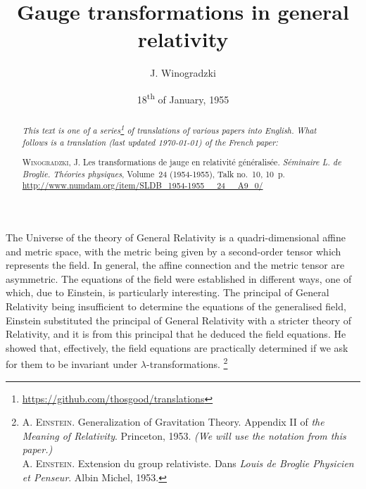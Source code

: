 \documentclass{article}
\theoremstyle{plain}
\theoremstyle{definition}
\newcommand{\oldpage}[1]{\marginpar{\footnotesize$\Big\vert$ \textit{p.~#1}}}
\begin{document}
\renewcommand{\abstractname}{Translator's note.}

\title{Gauge transformations in general relativity}
\author{J. Winogradzki}
\date{18\textsuperscript{th} of January, 1955}
\maketitle

\begin{abstract}
  \renewcommand*{\thefootnote}{\fnsymbol{footnote}}
  \emph{This text is one of a series\footnote{\url{https://github.com/thosgood/translations}} of translations of various papers into English.}
  \emph{What follows is a translation (last updated \today) of the French paper:}

  \medskip\noindent
  \textsc{Winogradzki, J}. Les transformations de jauge en relativité généralisée. \emph{Séminaire L. de Broglie. Théories physiques}, Volume~24 (1954-1955), Talk no.~10, 10~p. {\footnotesize\url{http://www.numdam.org/item/SLDB_1954-1955__24__A9_0/}}
\end{abstract}

\renewcommand*{\thefootnote}{(\arabic{footnote})}
\setcounter{footnote}{0}

\tableofcontents



\bigskip\bigskip
\oldpage{10-01}
The Universe of the theory of General Relativity is a quadri-dimensional affine and metric space, with the metric being given by a second-order tensor which represents the field.
In general, the affine connection and the metric tensor are asymmetric.
The equations of the field were established in different ways, one of which, due to Einstein, is particularly interesting.
The principal of General Relativity being insufficient to determine the equations of the generalised field, Einstein substituted the principal of General Relativity with a stricter theory of Relativity, and it is from this principal that he deduced the field equations.
He showed that, effectively, the field equations are practically determined if we ask for them to be invariant under $\lambda$-transformations.
\footnote{\textsc{A. Einstein}. Generalization of Gravitation Theory. Appendix II of \emph{the Meaning of Relativity}. Princeton, 1953. \emph{(We will use the notation from this paper.)}\\\textsc{A. Einstein}. Extension du group relativiste. Dans \emph{Louis de Broglie Physicien et Penseur}. Albin Michel, 1953.}
\end{document}
